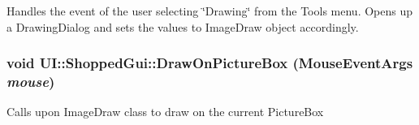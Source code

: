 \label{class_u_i_1_1_shopped_gui_aca1101f73de09ed9dade7398c1415bd0}
Handles the event of the user selecting \char`\"{}Drawing\char`\"{} from the Tools menu. Opens up a DrawingDialog and sets the values to ImageDraw object accordingly. \hypertarget{class_u_i_1_1_shopped_gui_a1b4d9d49a910f9a456e86a80bb2c7b35}{
\subsubsection[{DrawOnPictureBox}]{\setlength{\rightskip}{0pt plus 5cm}void UI::ShoppedGui::DrawOnPictureBox (MouseEventArgs {\em mouse})}}
\label{class_u_i_1_1_shopped_gui_a1b4d9d49a910f9a456e86a80bb2c7b35}
Calls upon ImageDraw class to draw on the current PictureBox


